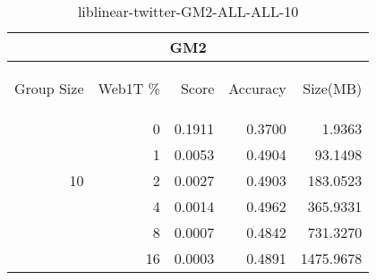 \begin{center}
\begin{table}[htbp] 
 \begin{center}
\begin{tabular}{ | r | r | r | r | r |}
\hline
\multicolumn{5}{|c|}{GM2}\\
\hline
\begin{sideways}Group Size\end{sideways} & \begin{sideways}Web1T \%\end{sideways} & \begin{sideways}Score\end{sideways} & \begin{sideways}Accuracy\end{sideways} & \begin{sideways}Size(MB)\end{sideways}\\
\hline
\multirow{5}{*}{10}
 & 0 & 0.1911 & 0.3700 & 1.9363\\ \cline{2-5}
 & 1 & 0.0053 & 0.4904 & 93.1498\\ \cline{2-5}
 & 2 & 0.0027 & 0.4903 & 183.0523\\ \cline{2-5}
 & 4 & 0.0014 & 0.4962 & 365.9331\\ \cline{2-5}
 & 8 & 0.0007 & 0.4842 & 731.3270\\ \cline{2-5}
 & 16 & 0.0003 & 0.4891 & 1475.9678\\ \cline{2-5}
\hline
\end{tabular}
\caption{liblinear-twitter-GM2-ALL-ALL-10}
\label{table:liblinear-twitter-GM2-ALL-ALL-10}
\end{center}
 \end{table}
\end{center}


